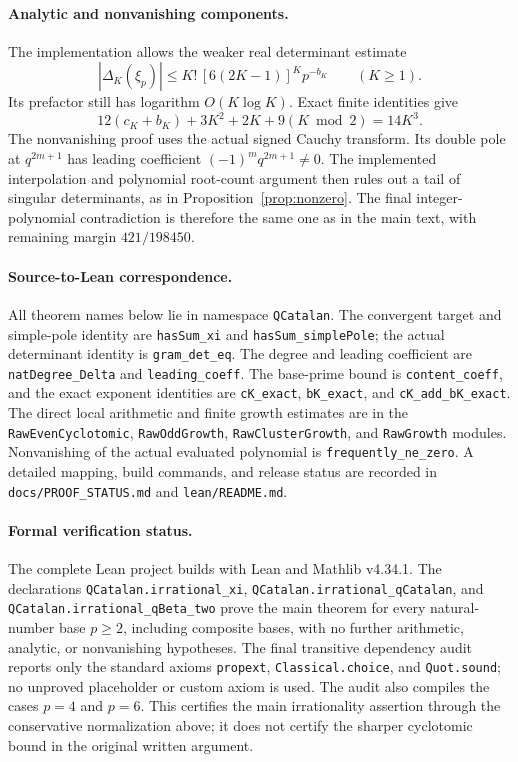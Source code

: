 \documentclass[11pt,letterpaper]{article}
\numberwithin{equation}{section}
\theoremstyle{remark}\newtheorem{remark}[theorem]{Remark}
\begin{document}
\paragraph{Analytic and nonvanishing components.}
The implementation allows the weaker real determinant estimate
\begin{equation*}
 |\Delta_K(\xi_p)|\le K!\,[6(2K-1)]^Kp^{-b_K}\qquad(K\ge1).
\end{equation*}
Its prefactor still has logarithm $O(K\log K)$. Exact finite identities give
\begin{equation*}
 12(c_K+b_K)+3K^2+2K+9(K\bmod2)=14K^3.
\end{equation*}
The nonvanishing proof uses the actual signed Cauchy transform. Its double
pole at $q^{2m+1}$ has leading coefficient $(-1)^m q^{2m+1}\ne0$.
The implemented interpolation and polynomial root-count argument then
rules out a tail of singular determinants, as in Proposition~\ref{prop:nonzero}.
The final integer-polynomial contradiction is therefore the same one as in
the main text, with remaining margin $421/198450$.

\paragraph{Source-to-Lean correspondence.}
All theorem names below lie in namespace \texttt{QCatalan}.
The convergent target and simple-pole identity are \texttt{hasSum\_xi} and
\texttt{hasSum\_simplePole}; the actual determinant identity is
\texttt{gram\_det\_eq}. The degree and leading coefficient are
\texttt{natDegree\_Delta} and \texttt{leading\_coeff}. The base-prime bound is
\texttt{content\_coeff}, and the exact exponent identities are
\texttt{cK\_exact}, \texttt{bK\_exact}, and \texttt{cK\_add\_bK\_exact}.
The direct local arithmetic and finite growth estimates are in the
\texttt{RawEvenCyclotomic}, \texttt{RawOddGrowth}, \texttt{RawClusterGrowth},
and \texttt{RawGrowth} modules. Nonvanishing of the actual evaluated
polynomial is \texttt{frequently\_ne\_zero}.
A detailed mapping, build commands, and release status are recorded in
\texttt{docs/PROOF\_STATUS.md} and \texttt{lean/README.md}.

\paragraph{Formal verification status.}
The complete Lean project builds with Lean and Mathlib v4.34.1.
The declarations \texttt{QCatalan.irrational\_xi},
\texttt{QCatalan.irrational\_qCatalan}, and
\texttt{QCatalan.irrational\_qBeta\_two} prove the main theorem for every
natural-number base $p\ge2$, including composite bases, with no further
arithmetic, analytic, or nonvanishing hypotheses. The final transitive
dependency audit reports only the standard axioms \texttt{propext},
\texttt{Classical.choice}, and \texttt{Quot.sound}; no unproved placeholder
or custom axiom is used. The audit also compiles the cases $p=4$ and $p=6$.
This certifies the main irrationality assertion through the conservative
normalization above; it does not certify the sharper cyclotomic bound in
the original written argument.


\end{document}
